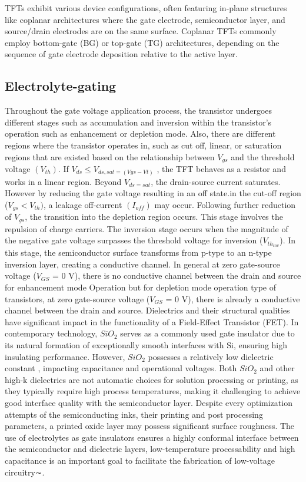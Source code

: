 TFTs exhibit various device configurations, often featuring in-plane structures like coplanar architectures where the gate electrode, semiconductor layer, and source/drain electrodes are on the same surface. Coplanar TFTs commonly employ bottom-gate (BG) or top-gate (TG) architectures, depending on the sequence of gate electrode deposition relative to the active layer. 
\subsection {Electrolyte-gating }
\label{Electrolyte-gating}
Throughout the gate voltage application process, the transistor undergoes different stages such as accumulation and inversion within the transistor's operation such as enhancement or depletion mode.
Also, there are different regions where the transistor operates in, such as cut off, linear, or saturation regions that are existed based on the relationship between $V_{gs}$ and the threshold voltage $(V_{th})$.
If $V_{ds} ≤ V_{ds,sat=(Vgs - Vt)}$ , the TFT behaves as a resistor and works in a linear region. Beyond $V_{ds=sat}$, the drain-source current saturates.
However by reducing the gate voltage resulting in an off state.in the cut-off region ($V_{gs} < V_{th})$, a leakage off-current $(I_{off})$ may occur.
Following further reduction of $V_{gs}$, the transition into the depletion region occurs. This stage involves the repulsion of charge carriers.
The inversion stage occurs when the magnitude of the negative gate voltage surpasses the threshold voltage for inversion ($V_{th_{inv}}$). In this stage, the semiconductor surface transforms from p-type to an n-type inversion layer, creating a conductive channel.
In general at zero gate-source voltage ($V_{GS}$ = 0 V), there is no conductive channel between the drain and source for enhancement mode Operation but for depletion mode operation type of transistors, at zero gate-source voltage ($V_{GS}$ = 0 V), there is already a conductive channel between the drain and source.
Dielectrics and  their structural qualities have significant impact in the functionality of a Field-Effect Transistor (FET). In contemporary technology, $SiO_2$ serves as a commonly used gate insulator due to its natural formation of exceptionally smooth interfaces with Si, ensuring high insulating performance. However, $SiO_2$ possesses a relatively low dielectric constant , impacting capacitance and operational voltages. Both $SiO_2$ and other high-k dielectrics are not automatic choices for solution processing or printing, as they typically require high process temperatures, making it challenging to achieve good interface quality with the semiconductor layer.
Despite every optimization attempts of  the semiconducting inks, their printing  and post processing parameters, a printed oxide layer may possess significant surface roughness. The use of electrolytes as gate insulators ensures a highly conformal interface between the semiconductor and dielectric layers, low-temperature processability and high capacitance is an important goal to facilitate the fabrication of low-voltage circuitry∼\cite{ref26}.

